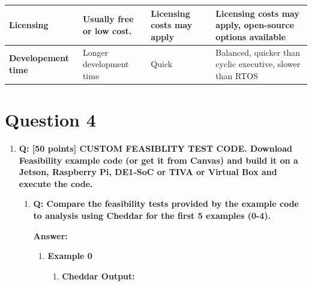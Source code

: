\documentclass[a4paper,11pt]{article}%
\newenvironment{qanda}{\setlength{\parindent}{0pt}}{\bigskip}
\newcommand{\Q}{\bigskip\bfseries Q: }
\newcommand{\A}{\par\textbf{Answer: } \normalfont}
\begin{document}
\begin{qanda}
\begin{enumerate}
\begin{table}[H]
\begin{tabular}{|l|p{4cm}|p{4cm}|p{4cm}|}
					\hline
					\textbf{Licensing}           & Usually free or low	cost.                    & Licensing costs may apply                              & Licensing costs may apply, open-source options available      \\
					\hline
					\textbf{Developement time}   & Longer development time                     & Quick                                                  & Balanced, quicker than cyclic	executive, slower than RTOS      \\
					\hline
				\end{tabular}
			\end{table}

	\end{enumerate}

	\pagebreak
	\section{Question 4}
	\begin{enumerate}
		\item[] \Q [50 points] CUSTOM FEASIBLITY TEST CODE. Download Feasibility example code (or
			get it from Canvas) and build it on a Jetson, Raspberry Pi, DE1-SoC or TIVA or Virtual Box
			and execute the code.
			\begin{enumerate}
				\item \Q  Compare the feasibility tests provided by the example code to analysis using Cheddar for
				      the first 5 examples (0-4).
				      \A

				      \begin{enumerate}
					      \item \textbf{Example 0}
					            \begin{enumerate}
						            \item \textbf{Cheddar Output:}\\


\end{enumerate}
\end{enumerate}
\end{enumerate}
\end{enumerate}
\end{qanda}
\end{document}
